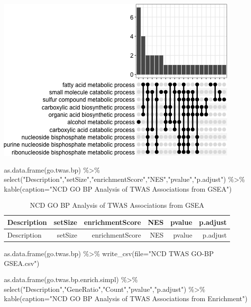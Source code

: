 \documentclass[
]{article}
\newenvironment{Shaded}{\begin{snugshade}}{\end{snugshade}}
\newcommand{\AttributeTok}[1]{\textcolor[rgb]{0.77,0.63,0.00}{#1}}
\newcommand{\FunctionTok}[1]{\textcolor[rgb]{0.00,0.00,0.00}{#1}}
\newcommand{\NormalTok}[1]{#1}
\newcommand{\SpecialCharTok}[1]{\textcolor[rgb]{0.00,0.00,0.00}{#1}}
\newcommand{\StringTok}[1]{\textcolor[rgb]{0.31,0.60,0.02}{#1}}
\begin{document}
\includegraphics{figures/twas-go-9.png}

\begin{Shaded}
\begin{Highlighting}[]
\FunctionTok{as.data.frame}\NormalTok{(go.twas.bp) }\SpecialCharTok{\%\textgreater{}\%} \FunctionTok{select}\NormalTok{(}\StringTok{"Description"}\NormalTok{,}\StringTok{"setSize"}\NormalTok{,}\StringTok{"enrichmentScore"}\NormalTok{,}\StringTok{"NES"}\NormalTok{,}\StringTok{"pvalue"}\NormalTok{,}\StringTok{"p.adjust"}\NormalTok{) }\SpecialCharTok{\%\textgreater{}\%}
  \FunctionTok{kable}\NormalTok{(}\AttributeTok{caption=}\StringTok{"NCD GO BP Analysis of TWAS Associations from GSEA"}\NormalTok{)}
\end{Highlighting}
\end{Shaded}

\begin{longtable}[]{@{}lrrrrr@{}}
\caption{NCD GO BP Analysis of TWAS Associations from
GSEA}\tabularnewline
\toprule()
Description & setSize & enrichmentScore & NES & pvalue & p.adjust \\
\midrule()
\endfirsthead
\toprule()
Description & setSize & enrichmentScore & NES & pvalue & p.adjust \\
\midrule()
\endhead
\bottomrule()
\end{longtable}

\begin{Shaded}
\begin{Highlighting}[]
\FunctionTok{as.data.frame}\NormalTok{(go.twas.bp) }\SpecialCharTok{\%\textgreater{}\%}
  \FunctionTok{write\_csv}\NormalTok{(}\AttributeTok{file=}\StringTok{"NCD TWAS GO{-}BP GSEA.csv"}\NormalTok{)}

\FunctionTok{as.data.frame}\NormalTok{(go.twas.bp.enrich.simpl) }\SpecialCharTok{\%\textgreater{}\%} \FunctionTok{select}\NormalTok{(}\StringTok{"Description"}\NormalTok{,}\StringTok{"GeneRatio"}\NormalTok{,}\StringTok{"Count"}\NormalTok{,}\StringTok{"pvalue"}\NormalTok{,}\StringTok{"p.adjust"}\NormalTok{) }\SpecialCharTok{\%\textgreater{}\%} 
  \FunctionTok{kable}\NormalTok{(}\AttributeTok{caption=}\StringTok{"NCD GO BP Analysis of TWAS Associations from Enrichment"}\NormalTok{)}
\end{Highlighting}
\end{Shaded}
\end{document}
